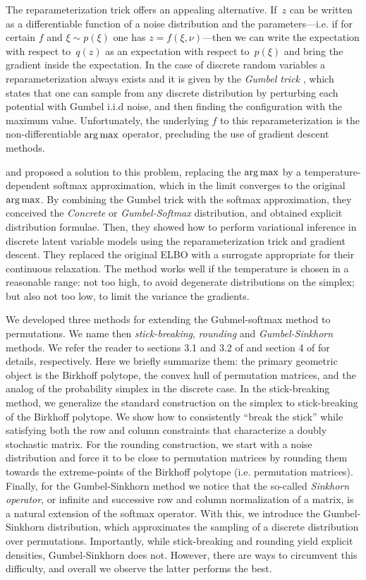 \documentclass{article}
\begin{document}
The reparameterization trick \cite{Kingma2013} offers an appealing
alternative. If~$z$ can be written as a differentiable function of a
noise distribution and the parameters---i.e. if for certain $f$ and
$\xi\sim p(\xi)$ one has $z=f(\xi,\nu)$---then we can write the
expectation with respect to~$q(z)$ as an expectation with respect
to~$p(\xi)$ and bring the gradient inside the expectation.  In the
case of discrete random variables a reparameterization always exists
and it is given by the \emph{Gumbel trick}
\citep{Papandreou2011}, which states that one can sample
from any discrete distribution by perturbing each potential with
Gumbel i.i.d noise, and then finding the configuration with the
maximum value. Unfortunately, the underlying $f$ to this
reparameterization is the non-differentiable $\argmax$ operator,
precluding the use of gradient descent methods.

\citet{Jang2016} and \citet{Maddison2016} proposed a solution to this
problem, replacing the $\argmax$ by a temperature-dependent softmax
approximation, which in the limit converges to the original
$\argmax$. By combining the Gumbel trick with the softmax
approximation, they conceived the \emph{Concrete} or
\emph{Gumbel-Softmax} distribution, and obtained explicit distribution
formulae. Then, they showed how to perform variational inference in
discrete latent variable models using the reparameterization trick and
gradient descent. They replaced the original ELBO with a surrogate
appropriate for their continuous relaxation. The method works well if 
the temperature is chosen in a reasonable range: not too high, to avoid
degenerate distributions on the simplex; but also not too low, to
limit the variance the gradients.

We developed three methods for extending the Gubmel-softmax method to
permutations. We name then \emph{stick-breaking}, \emph{rounding} and
\emph{Gumbel-Sinkhorn} methods. We refer the reader to sections 3.1
and 3.2 of \cite{Linderman2017} and section 4 of
\cite{Anonymous2018learning} for details, respectively. Here we
briefly summarize them: the primary geometric object is the Birkhoff
polytope, the convex hull of permutation matrices, and the analog of
the probability simplex in the discrete case. In the stick-breaking
method, we generalize the standard construction on the simplex to
stick-breaking of the Birkhoff polytope. We show how to consistently
``break the stick'' while satisfying both the row and column
constraints that characterize a doubly stochastic matrix. For the
rounding construction, we start with a noise distribution and force it
to be close to permutation matrices by rounding them towards the
extreme-points of the Birkhoff polytope (i.e. permutation
matrices). Finally, for the Gumbel-Sinkhorn method we notice that the
so-called \emph{Sinkhorn operator}, or infinite and successive row and
column normalization of a matrix, is a natural extension of the
softmax operator. With this, we introduce the Gumbel-Sinkhorn
distribution, which approximates the sampling of a discrete
distribution over permutations. Importantly, while stick-breaking and
rounding yield explicit densities, Gumbel-Sinkhorn does not. However,
there are ways to circumvent this difficulty, and overall we observe
the latter performs the best.
\end{document}
